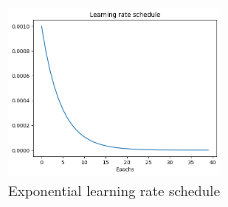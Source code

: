 \begin{figure}[ht]
    \centering
    \includegraphics[width=0.5\textwidth]{Images/lr.png}
    \caption{Exponential learning rate schedule}
    \label{fig:lr-schedule}
\end{figure}
